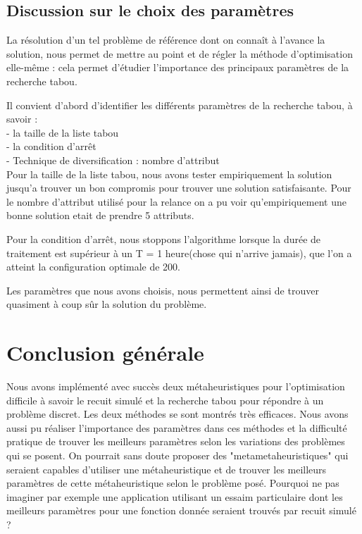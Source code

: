 \documentclass{report}
\begin{document}
\section{Discussion sur le choix des paramètres}
La résolution d'un tel problème de référence dont on connaît à l'avance la solution, nous permet de mettre au point et de régler la méthode d'optimisation elle-même : cela permet d'étudier l'importance des principaux paramètres de la recherche tabou.

Il convient d'abord d'identifier les différents paramètres de la recherche tabou, à savoir :\\
- la taille de la liste tabou\\
- la condition d'arrêt\\
- Technique de diversification : nombre d'attribut\\

Pour la taille de la liste tabou, nous avons tester empiriquement la solution jusqu'a trouver un bon compromis pour trouver une solution satisfaisante. 
Pour le nombre d'attribut utilisé pour la relance on a pu voir qu'empiriquement une bonne solution etait de prendre 5 attributs.

Pour la condition d'arrêt, nous stoppons l'algorithme lorsque la durée de traitement est supérieur à un T = 1 heure(chose qui n'arrive jamais), que l'on a atteint la configuration optimale de 200.

Les paramètres que nous avons choisis, nous permettent ainsi de trouver quasiment à coup sûr la solution du problème.
\chapter{Conclusion générale}
Nous avons implémenté avec succès deux métaheuristiques pour l'optimisation difficile à savoir le recuit simulé et la recherche tabou pour répondre à un problème discret. Les deux méthodes se sont montrés très efficaces. Nous avons aussi pu réaliser l'importance des paramètres dans ces méthodes et la difficulté pratique de trouver les meilleurs paramètres selon les variations des problèmes qui se posent. On pourrait sans doute proposer des "metametaheuristiques" qui seraient capables d’utiliser une métaheuristique et de trouver
les meilleurs paramètres de cette métaheuristique selon le problème posé. Pourquoi
ne pas imaginer par exemple une application utilisant un essaim particulaire dont les
meilleurs paramètres pour une fonction donnée seraient trouvés par recuit simulé ?
\end{document}
